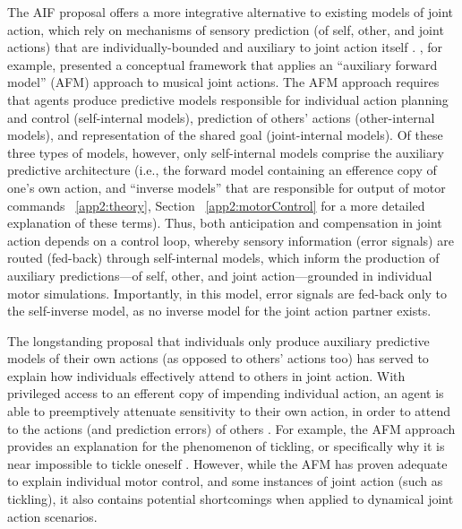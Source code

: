 \begin{CJK}{UTF8}{gbsn}
The AIF proposal offers a more integrative alternative to existing models of joint action, which rely on mechanisms of sensory prediction (of self, other, and joint actions) that are individually-bounded and auxiliary to joint action itself \citep{Pesquita2017}.   \textcite{Keller2016}, for example, presented a conceptual framework that applies an ``auxiliary forward model'' (AFM) approach to musical joint actions.  The AFM approach requires that agents produce predictive models responsible for individual action planning and control (self-internal models), prediction of others' actions (other-internal models), and representation of the shared goal (joint-internal models).  Of these three types of models, however, only self-internal models comprise the auxiliary predictive architecture (i.e., the forward model containing an efference copy of one's own action, and ``inverse models'' that are responsible for output of motor commands ~\ref{app2:theory}, Section ~\ref{app2:motorControl} for a more detailed explanation of these terms).  Thus, both anticipation and compensation in joint action depends on a control loop, whereby sensory information (error signals) are routed (fed-back) through self-internal models, which inform the production of auxiliary predictions---of self, other, and joint action---grounded in individual motor simulations.  Importantly, in this model,  error signals are fed-back only to the self-inverse model, as no inverse model for the joint action partner exists.

The longstanding proposal that individuals only produce auxiliary predictive models of their own actions (as opposed to others' actions too) has served to explain how individuals effectively attend to others in joint action.  With privileged access to an efferent copy of impending individual action, an agent is able to preemptively attenuate sensitivity to their own action, in order to attend to the actions (and prediction errors) of others \citep{Wolpert1998}.  For example, the AFM approach provides an explanation for the phenomenon of tickling, or specifically why it is near impossible to tickle oneself \citep[due to sensory attenuation resulting from the self-generated predictions about the consequences of action][]{Blakemore2003}. However, while the AFM has proven adequate to explain individual motor control, and some instances of joint action (such as tickling), it also contains potential shortcomings when applied to dynamical joint action scenarios.


\end{CJK}
